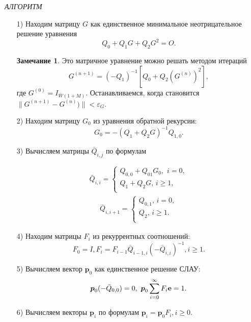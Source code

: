 \documentclass[12pt,a4paper]{article}
\newcommand{\bs}{\boldsymbol}
\begin{document}
{\it АЛГОРИТМ}

\begin{itemize}
    \item[1)] Находим матрицу $G$ как единственное минимальное неотрицательное
    решение уравнения
    $$
    Q_0+Q_1G+Q_2G^2=O.
    $$

    {\bf Замечание 1}. Это матричное уравнение можно решать методом итераций
 $$
 G^{(n+1)}=(-Q_1)^{-1}[Q_0+Q_2 (G^{(n)})^2],
 $$
 где $G^{(0)}=I_{\bar{W}(1+M)}.$ Останавливаемся, когда становится  $\| G^{(n+1)}-G^{(n)})\|<\varepsilon_G.$

    \item[2)] Находим матрицу $G_0$ из уравнения обратной рекурсии:
    $$
    G_0=-\left(
    Q_1+Q_2G\right)^{-1}Q_{1,0}.
    $$

     \item[3)] Вычисляем матрицы $\bar{Q}_{i,j}$  по формулам

     \begin{align*}
              \bar Q_{i,i} =     \left\{
                \begin{array}{l}
     Q_{0,0} + Q_{01}G_0,\,\,i=0,\\
    Q_1 + Q_2G,\,i\geq 1,\\
                \end{array}
            \right.
    \end{align*}
    \begin{align*}
              \bar Q_{i,i+1} =     \left\{
                \begin{array}{l}
     Q_{0,1},\,i=0,\\
    Q_2,\,i\geq 1.\\
                \end{array}
            \right.
    \end{align*}



    \item[4)] Находим матрицы $F_{i}$  из рекуррентных соотношений:
    $$
    F_{0}=I,F_{i}=F_{i-1}\bar{Q}_{i-1,i}\left( -\bar{Q}_{i,i}
    \right)^{-1},i\ge 1.
    $$

    \item[5)] Вычисляем вектор $\bs{p}_{0}$ как единственное решение
    СЛАУ:
    $$
     \bs{p}_{0}(-\bar{Q}_{0,0})=0,\,\,
        \bs{p}_{0}\displaystyle\sum_{i=0}^{\infty} F_{i}{\bf e}=1.
         $$
    \item[6)] Вычисляем векторы $\bs{p}_{i}$  по формулам
   $
    \bs{p}_{i}=\bs{p}_{0}F_{i},i\geq 0.
   $



\end{itemize}
\end{document}
